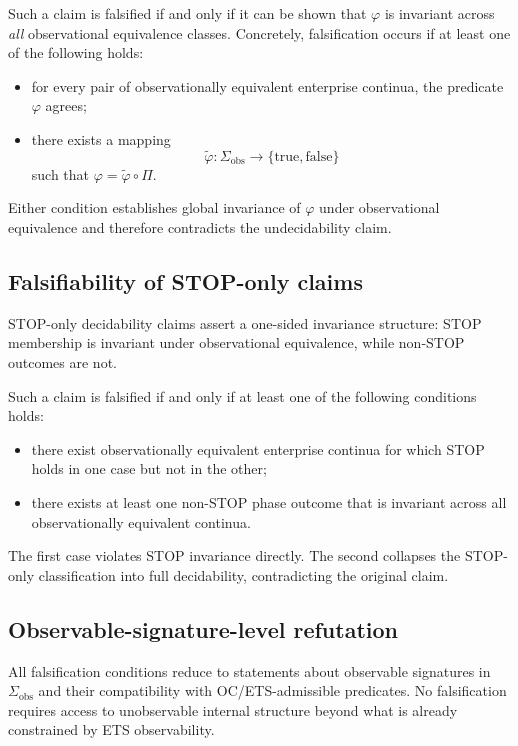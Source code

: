 Such a claim is falsified if and only if it can be shown that
$\varphi$ is invariant across \emph{all} observational equivalence
classes. Concretely, falsification occurs if at least one of the
following holds:
\begin{itemize}
\item for every pair of observationally equivalent enterprise continua,
      the predicate $\varphi$ agrees;
\item there exists a mapping
      \[
      \tilde{\varphi} : \Sigma_{\mathrm{obs}} \to
      \{\text{true},\text{false}\}
      \]
      such that $\varphi = \tilde{\varphi} \circ \Pi$.
\end{itemize}

Either condition establishes global invariance of $\varphi$ under
observational equivalence and therefore contradicts the undecidability
claim.

\subsection{Falsifiability of STOP-only claims}
\label{subsec:falsifiability-stop-only}

STOP-only decidability claims assert a one-sided invariance structure:
STOP membership is invariant under observational equivalence, while
non-STOP outcomes are not.

Such a claim is falsified if and only if at least one of the following
conditions holds:
\begin{itemize}
\item there exist observationally equivalent enterprise continua for
      which STOP holds in one case but not in the other;
\item there exists at least one non-STOP phase outcome that is invariant
      across all observationally equivalent continua.
\end{itemize}

The first case violates STOP invariance directly. The second collapses
the STOP-only classification into full decidability, contradicting the
original claim.

\subsection{Observable-signature-level refutation}
\label{subsec:falsifiability-signatures}

All falsification conditions reduce to statements about observable
signatures in $\Sigma_{\mathrm{obs}}$ and their compatibility with
OC/ETS-admissible predicates. No falsification requires access to
unobservable internal structure beyond what is already constrained by
ETS observability.

